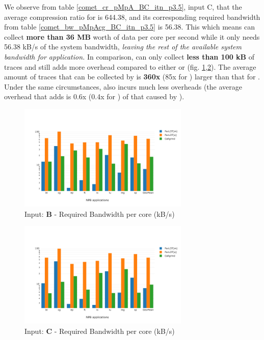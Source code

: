We observe from table \ref{comet_cr_pMpA_BC_itn_p3.5}, input C, that the
average compression ratio for \parlota is 644.38, and its
corresponding required bandwidth from table
\ref{comet_bw_pMpAcg_BC_itn_p3.5} is 56.38.
%
This which means \parlot can
collect \textbf{more than 36 MB} worth of data per core per second
while it only needs 56.38 kB/s of the system bandwidth, {\em leaving the rest of
the available system bandwidth for application.}
%
In comparison, \callgrind can only
collect \textbf{less than 100 kB} of traces and still adds more
overhead compared to either \parlota or \parlotm
(fig. \ref{comet_chartAvg_bw_B_p3_5},\ref{comet_chartAvg_bw_C_p3_5}). 
%
The average amount of traces that can be collected by \parlota is
\textbf{360x} (85x for \parlotm) larger than that for \callgrind.
%
Under the same circumstances,
\parlota also incurs much less overheads (the
average overhead that \parlota adds is 0.6x (0.4x for \parlotm)
of that caused by \callgrind).


\begin{figure}[t]
\centering
\includegraphics[width=3.2in]{figs.comet.newMed/comet_chartAvg_bw_B_p3_5.png}
\caption{ Input: \textbf{B} - Required Bandwidth per core (kB/s)
}
\label{comet_chartAvg_bw_B_p3_5}
\end{figure}



\begin{figure}[t]
\centering
\includegraphics[width=3.2in]{figs.comet.newMed/comet_chartAvg_bw_C_p3_5.png}
\caption{ Input: \textbf{C}  - Required Bandwidth per core (kB/s)
}
\label{comet_chartAvg_bw_C_p3_5}
\end{figure}


